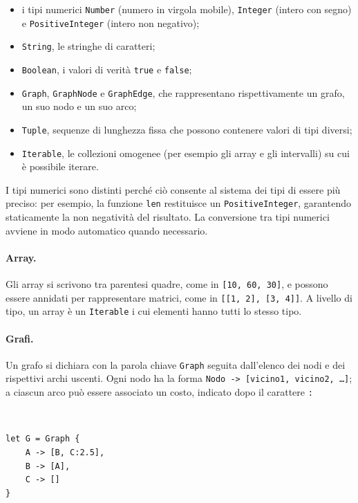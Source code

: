 \begin{itemize}
  \item i tipi numerici \texttt{Number} (numero in virgola mobile),
        \texttt{Integer} (intero con segno) e \texttt{PositiveInteger}
        (intero non negativo);
  \item \texttt{String}, le stringhe di caratteri;
  \item \texttt{Boolean}, i valori di verità \texttt{true} e \texttt{false};
  \item \texttt{Graph}, \texttt{GraphNode} e \texttt{GraphEdge}, che rappresentano
        rispettivamente un grafo, un suo nodo e un suo arco;
  \item \texttt{Tuple}, sequenze di lunghezza fissa che possono contenere valori
        di tipi diversi;
  \item \texttt{Iterable}, le collezioni omogenee (per esempio gli array e gli
        intervalli) su cui è possibile iterare.
\end{itemize}

I tipi numerici sono distinti perché ciò consente al sistema dei tipi di essere
più preciso: per esempio, la funzione \texttt{len} restituisce un
\texttt{PositiveInteger}, garantendo staticamente la non negatività del
risultato. La conversione tra tipi numerici avviene in modo automatico quando
necessario.

\paragraph{Array.}
Gli array si scrivono tra parentesi quadre, come in \texttt{[10, 60, 30]}, e
possono essere annidati per rappresentare matrici, come in
\texttt{[[1, 2], [3, 4]]}. A livello di tipo, un array è un \texttt{Iterable} i
cui elementi hanno tutti lo stesso tipo.

\paragraph{Grafi.}
Un grafo si dichiara con la parola chiave \texttt{Graph} seguita dall'elenco dei
nodi e dei rispettivi archi uscenti. Ogni nodo ha la forma
\texttt{Nodo -> [vicino1, vicino2, \ldots]}; a ciascun arco può essere associato
un costo, indicato dopo il carattere \texttt{:}

\

\begin{lstlisting}[caption={Dichiarazione di un grafo con costi sugli archi.}, label={lst:grafo}]
let G = Graph {
    A -> [B, C:2.5],
    B -> [A],
    C -> []
}
\end{lstlisting}

